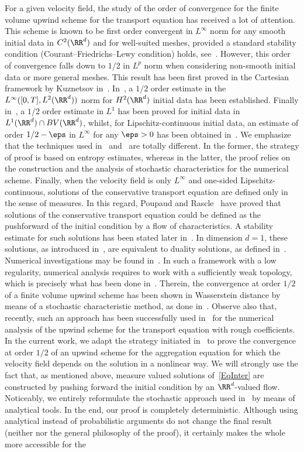 For a given velocity field, the study of the order of convergence for the finite volume upwind scheme for the transport equation has received a lot of attention. This scheme is known to be first order convergent in $L^\infty$ norm for any smooth initial data in $C^2(\RR^d)$ and for well-suited meshes, provided a standard stability condition (Courant--Friedrichs--Lewy condition) holds, see~\cite{bouche}. However, this order of convergence falls down to $1/2$ in $L^p$ norm when considering non-smooth initial data or more general meshes. This result has been first proved in the Cartesian framework by Kuznetsov in~\cite{Kuznetsov}. In~\cite{Despres}, a $1/2$ order estimate in the $L^\infty([0,T],L^2(\RR^d))$ norm for $H^2(\RR^d)$ initial data has been established. Finally in~\cite{caniveau,MV}, a $1/2$ order estimate in $L^1$ has been proved for initial data in $L^1(\RR^d)\cap BV(\RR^d)$, whilst, for Lipschitz-continuous initial data, an estimate of order $1/2-\eps$ in $L^\infty$ for any $\eps>0$ has been obtained in~\cite{caniveau,M}. We emphasize that the techniques used in~\cite{M,MV} and~\cite{caniveau} are totally different. In the former, the strategy of proof is based on entropy estimates, whereas in the latter, the proof relies on the construction and the analysis of stochastic characteristics for the numerical scheme. Finally, when the velocity field is only $L^\infty$ and one-sided Lipschitz-continuous, solutions of the conservative transport equation are defined only in the sense of measures. In this regard, Poupaud and Rascle~\cite{PoupaudRascle} have proved that solutions of the conservative transport equation could be defined as the pushforward of the initial condition by a flow of characteristics. A stability estimate for such solutions has been stated later in~\cite{Bianchini}. In dimension $d=1$, these solutions, as introduced in~\cite{PoupaudRascle}, are equivalent to duality solutions, as defined in~\cite{bj1}. Numerical investigations may be found in~\cite{GJ}. In such a framework with a low regularity, numerical analysis requires to work with a sufficiently weak topology, which is precisely what has been done in~\cite{DLV}. Therein, the convergence at order $1/2$ of a finite volume upwind scheme has been shown in Wasserstein distance by means of a stochastic characteristic method, as done in~\cite{caniveau}. Observe also that, recently, such an approach has been successfully used in~\cite{schlichting} for the numerical analysis of the upwind scheme for the transport equation with rough coefficients. In the current work, we adapt the strategy initiated in~\cite{DLV} to prove the convergence at order $1/2$ of an upwind scheme for the aggregation equation for which the velocity field depends on the solution in a nonlinear way. We will strongly use the fact that, as mentioned above, measure valued solutions of~\eqref{EqInter} are constructed by pushing forward the initial condition by an $\RR^d$-valued flow. Noticeably, we entirely reformulate the stochastic approach used in~\cite{DLV} by means of analytical tools. In the end, our proof is completely deterministic. Although using analytical instead of probabilistic arguments do not change the final result (neither nor the general philosophy of the proof), it certainly makes the whole more accessible for the 